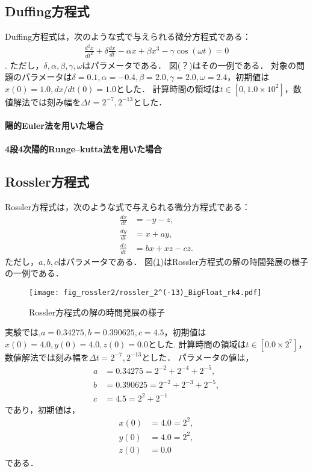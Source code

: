 \subsection{Duffing方程式}
Duffing方程式は，次のような式で与えられる微分方程式である：
\begin{align}
    \frac{d^2 x}{dt^2} + \delta\frac{dx}{dt} - \alpha x + \beta x^3 - \gamma \cos(\omega t) = 0
\end{align}.
ただし，$\delta,\alpha,\beta,\gamma,\omega$はパラメータである．
図(？)はその一例である．
対象の問題のパラメータは$\delta=0.1, \alpha=-0.4, \beta=2.0, \gamma=2.0, \omega=2.4$，初期値は$x(0) = 1.0, dx/dt(0) = 1.0$とした．
計算時間の領域は$t \in [0,1.0 \times 10^2]$，数値解法では刻み幅を$\Delta t =  2^{-7}, 2^{-13}$とした．
\paragraph*{陽的Euler法を用いた場合}

\paragraph*{4段4次陽的Runge--kutta法を用いた場合}

\subsection{Rossler方程式}
Rossler方程式は，次のような式で与えられる微分方程式である：
\begin{align}
    \frac{dx}{dt} &= -y-z, \\
    \frac{dy}{dt} &= x+ay, \\
    \frac{dz}{dt} &= bx + xz - cz.
\end{align}
ただし，$a,b,c$はパラメータである．
図(\ref{fig:rossler})はRossler方程式の解の時間発展の様子の一例である．
\begin{figure}[H]
    \centering
    \texttt{[image: fig\_rossler2/rossler\_2^(-13)\_BigFloat\_rk4.pdf]}
    \caption{Rossler方程式の解の時間発展の様子}
    \label{fig:rossler}
\end{figure}
実験では,$a=0.34275, b=0.390625, c=4.5$，初期値は$x(0) = 4.0, y(0) = 4.0, z(0) = 0.0$とした.
計算時間の領域は$t \in [0.0 \times 2^7]$，数値解法では刻み幅を$\Delta t =   2^{-7},2^{-13}$とした．
パラメータの値は，
\begin{align}
    a &= 0.34275 = 2^{-2} + 2^{-4} + 2^{-5},\\
    b &= 0.390625 = 2^{-2} + 2^{-3} + 2^{-5},\\ 
    c &= 4.5 = 2^2 + 2^{-1}
\end{align}
であり，初期値は，
\begin{align}
    x(0) &= 4.0 = 2^2,\\
    y(0) &= 4.0 = 2^2 ,\\
    z(0) &= 0.0 
\end{align}
である．
